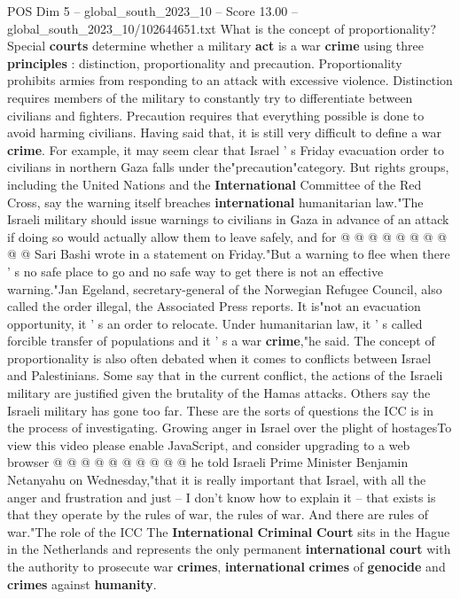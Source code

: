 \begin{textsample}{POS Dim 5 – global\_south\_2023\_10 – Score 13.00 – global\_south\_2023\_10/102644651.txt}
What is the concept of proportionality?
Special \textbf{courts} determine whether a military \textbf{act} is a war \textbf{crime} using three \textbf{principles} : distinction, proportionality and precaution.
Proportionality prohibits armies from responding to an attack with excessive violence.
Distinction requires members of the military to constantly try to differentiate between civilians and fighters.
Precaution requires that everything possible is done to avoid harming civilians.
Having said that, it is still very difficult to define a war \textbf{crime}.
For example, it may seem clear that Israel ' s Friday evacuation order to civilians in northern Gaza falls under the"precaution"category.
But rights groups, including the United Nations and the \textbf{International} Committee of the Red Cross, say the warning itself breaches \textbf{international} humanitarian law."The Israeli military should issue warnings to civilians in Gaza in advance of an attack if doing so would actually allow them to leave safely, and for @ @ @ @ @ @ @ @ @ @ Sari Bashi wrote in a statement on Friday."But a warning to flee when there ' s no safe place to go and no safe way to get there is not an effective warning."Jan Egeland, secretary-general of the Norwegian Refugee Council, also called the order illegal, the Associated Press reports.
It is"not an evacuation opportunity, it ' s an order to relocate.
Under humanitarian law, it ' s called forcible transfer of populations and it ' s a war \textbf{crime},"he said.
The concept of proportionality is also often debated when it comes to conflicts between Israel and Palestinians.
Some say that in the current conflict, the actions of the Israeli military are justified given the brutality of the Hamas attacks.
Others say the Israeli military has gone too far.
These are the sorts of questions the ICC is in the process of investigating.
Growing anger in Israel over the plight of hostagesTo view this video please enable JavaScript, and consider upgrading to a web browser @ @ @ @ @ @ @ @ @ @ he told Israeli Prime Minister Benjamin Netanyahu on Wednesday,"that it is really important that Israel, with all the anger and frustration and just -- I don't know how to explain it -- that exists is that they operate by the rules of war, the rules of war.
And there are rules of war."The role of the ICC The \textbf{International} \textbf{Criminal} \textbf{Court} sits in the Hague in the Netherlands and represents the only permanent \textbf{international} \textbf{court} with the authority to prosecute war \textbf{crimes}, \textbf{international} \textbf{crimes} of \textbf{genocide} and \textbf{crimes} against \textbf{humanity}.

\end{textsample}
